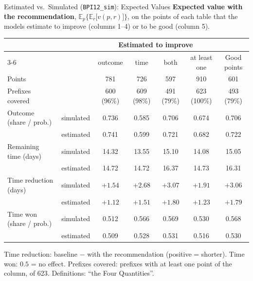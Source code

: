 \documentclass[aspectratio=169]{beamer} %
\begin{document}
\begin{frame}{Estimated vs.\ Simulated (\texttt{BPI12\_sim}): Expected Values}
  \scriptsize\setlength{\aboverulesep}{0pt}\setlength{\belowrulesep}{1pt}
  \textbf{Expected value with the recommendation}, $\mathbb{E}_p\big\{\mathbb{E}_r\big[v(p,r)\big]\big\}$,
  on the points of each table that the models estimate to improve (columns 1--4) or to be good (column 5).
  \begin{center}\setlength{\tabcolsep}{3pt}
  \begin{tabular}{ll ccccc}
    \toprule
     & & \multicolumn{4}{c}{Estimated to improve} & \\
    \cmidrule(lr){3-6}
     & & outcome & time & both & at least one & Good points \\
    \midrule
    Points & & 781 & 726 & 597 & 910 & 601 \\
    Prefixes covered & & 600 (96\%) & 609 (98\%) & 491 (79\%) & 623 (100\%) & 493 (79\%) \\
    \midrule
    Outcome (share / prob.) & simulated & 0.736 & 0.585 & 0.706 & 0.674 & 0.706 \\
     & estimated & 0.741 & 0.599 & 0.721 & 0.682 & 0.722 \\
    \addlinespace[2pt]
    Remaining time (days) & simulated & 14.32 & 13.55 & 15.10 & 14.08 & 15.05 \\
     & estimated & 14.72 & 14.72 & 16.37 & 14.73 & 16.31 \\
    \addlinespace[2pt]
    Time reduction (days) & simulated & $+1.54$ & $+2.68$ & $+3.07$ & $+1.91$ & $+3.06$ \\
     & estimated & $+1.12$ & $+1.51$ & $+1.80$ & $+1.23$ & $+1.79$ \\
    \addlinespace[2pt]
    Time won (share / prob.) & simulated & 0.512 & 0.566 & 0.569 & 0.530 & 0.568 \\
     & estimated & 0.509 & 0.528 & 0.531 & 0.516 & 0.530 \\
    \bottomrule
  \end{tabular}
  \end{center}
  {\tiny Time reduction: baseline $-$ with the recommendation (positive = shorter). Time won: $0.5$ = no effect.
  Prefixes covered: prefixes with at least one point of the column, of 623. Definitions: ``the Four Quantities''.}
\end{frame}
\end{document}
